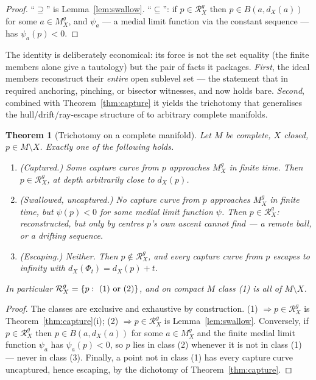 \documentclass[11pt]{article}
\newtheorem{theorem}{Theorem}[section]
\theoremstyle{remark}
\newcommand{\X}{X}
\newcommand{\Mg}{M^{g}_{\X}}
\newcommand{\Rg}{\mathcal{R}^{g}_{\X}}
\newcommand{\dX}{d_{\X}}
\begin{document}
\begin{proof}
``$\supseteq$'' is Lemma~\ref{lem:swallow}. ``$\subseteq$'': if
$p\in\Rg$ then $p\in B(a,\dX(a))$ for some $a\in\Mg$, and
$\psi_{a}$ --- a medial limit function via the constant sequence ---
has $\psi_{a}(p)<0$.
\end{proof}

The identity is deliberately economical: its force is not the set
equality (the finite members alone give a tautology) but the pair of
facts it packages. \emph{First}, the ideal members reconstruct their
\emph{entire} open sublevel set --- the statement that in
\cite{R2,R3} required anchoring, pinching, or bisector witnesses, and
now holds bare. \emph{Second}, combined with
Theorem~\ref{thm:capture} it yields the trichotomy that generalises
the hull/drift/ray-escape structure of \cite[Thm.~2.1]{R3} to
arbitrary complete manifolds.

\begin{theorem}[Trichotomy on a complete manifold]\label{thm:trichotomy}
Let $M$ be complete, $\X$ closed, $p\in M\setminus\X$. Exactly one of
the following holds.
\begin{enumerate}[label=\textup{(\arabic*)}]
\item\emph{(Captured.)} Some capture curve from $p$ approaches $\Mg$
in finite time. Then $p\in\Rg$, at depth arbitrarily close to
$\dX(p)$.
\item\emph{(Swallowed, uncaptured.)} No capture curve from $p$
approaches $\Mg$ in finite time, but $\psi(p)<0$ for some medial limit
function $\psi$. Then $p\in\Rg$: reconstructed, but only by centres
$p$'s own ascent cannot find --- a remote ball, or a drifting sequence.
\item\emph{(Escaping.)} Neither. Then $p\notin\Rg$, and every capture
curve from $p$ escapes to infinity with $\dX(\Phi_{t})=\dX(p)+t$.
\end{enumerate}
In particular $\Rg=\{p:\ \textup{(1) or (2)}\}$, and on compact $M$
class \textup{(1)} is all of $M\setminus\X$.
\end{theorem}

\begin{proof}
The classes are exclusive and exhaustive by construction. (1)
$\Rightarrow p\in\Rg$ is Theorem~\ref{thm:capture}(i); (2)
$\Rightarrow p\in\Rg$ is Lemma~\ref{lem:swallow}. Conversely, if
$p\in\Rg$ then $p\in B(a,\dX(a))$ for some $a\in\Mg$ and the finite
medial limit function $\psi_{a}$ has $\psi_{a}(p)<0$, so $p$ lies in
class (2) whenever it is not in class (1) --- never in class (3).
Finally, a point not in class (1) has every capture curve uncaptured,
hence escaping, by the dichotomy of Theorem~\ref{thm:capture}.
\end{proof}
\end{document}
